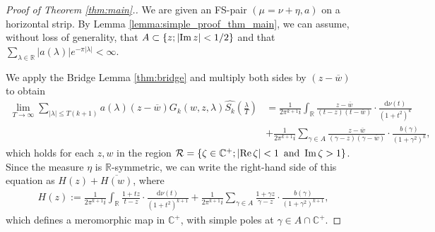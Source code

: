 \documentclass[a4paper,reqno,12pt]{amsart}
\newcommand{\R}{\mathcal{R}}
\renewcommand{\r}{\mathbb{R}}
\newcommand{\cp}{\mathbb{C}} %
\newcommand{\ft}{\widehat}
\newcommand{\la}{\lambda}
\newcommand{\ga}{\gamma}
\renewcommand{\d}{\mathrm{d}}
\newcommand{\ov}[1]{\overline{#1}}
\newcommand{\w}{\ov{w}}
\newcommand{\cd}{\cdot}
\newcommand{\1}{{\bf 1}}
\newcommand{\ra}{\rightarrow}
\renewcommand{\Re}{{\rm Re}\,}
\renewcommand{\Im}{{\rm Im}\,}
\begin{document}
\begin{proof}[Proof of Theorem \ref{thm:main}.]
We are given an FS-pair $(\mu=\nu+\eta,a)$ on a horizontal strip. By Lemma \ref{lemma:simple_proof_thm_main}, we can assume, without loss of generality, that $A\subset\{z;|\Im{z}|<1/2\}$ and that $\sum_{\la\in\r} |a(\la)|e^{-\pi|\la|}<\infty$. 

We apply the Bridge Lemma \ref{thm:bridge} and multiply both sides by $(z-\w)$ to obtain
\begin{align}
\label{eq:thm1_bridge}
    \lim_{T\ra\infty} \sum_{|\la|\leq T(k+1)}a(\la)(z-\w)G_k(w,z,\la)\ft{S_k}\left(\frac{\la}{T}\right)&=\frac{1}{2\pi^{k+1}i} \int_{\r} \frac{z-\w}{(t-z)(t-\w)}\cd \frac{\d\nu(t)}{(1+t^2)^k}\\
    &+\frac{1}{2\pi^{k+1}i} \sum_{\ga\in A} \frac{z-\w}{(\ga-z)(\ga-\w)}\cd \frac{b(\ga)}{(1+\ga^2)^k},
\end{align}
which holds for each $z,w$ in the region $\R=\{\zeta\in\cp^+;|\Re{\zeta}|<1\, \text{ and }\, \Im{\zeta}>1\}$. Since the measure $\eta$ is $\r$-symmetric, we can write the right-hand side of this equation as $H(z)+\ov{H(w)}$, where
\begin{align*}
    H(z):=\frac{1}{2\pi^{k+1}i} \int_{\r} \frac{1+tz}{t-z}\cd \frac{\d\nu(t)}{(1+t^2)^{k+1}}+\frac{1}{2\pi^{k+1}i} \sum_{\ga\in A} \frac{1+\ga z}{\ga-z}\cd \frac{b(\ga)}{(1+\ga^2)^{k+1}},
\end{align*}
which defines a meromorphic map in $\cp^+$, with simple poles at $\ga\in A\cap\cp^+$.


\end{proof}
\end{document}
